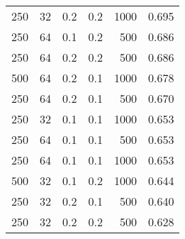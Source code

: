 \begin{table}[H]
\begin{tabular}{c|c|c|c|r|c}
    250                                & 32                             & 0.2                         & 0.2                                  & 1000                                & 0.695                  \\
    250                                & 64                             & 0.1                         & 0.2                                  & 500                                 & 0.686                  \\
    250                                & 64                             & 0.2                         & 0.2                                  & 500                                 & 0.686                  \\
    500                                & 64                             & 0.2                         & 0.1                                  & 1000                                & 0.678                  \\
    250                                & 64                             & 0.2                         & 0.1                                  & 500                                 & 0.670                  \\
    250                                & 32                             & 0.1                         & 0.1                                  & 1000                                & 0.653                  \\
    250                                & 64                             & 0.1                         & 0.1                                  & 500                                 & 0.653                  \\
    250                                & 64                             & 0.1                         & 0.1                                  & 1000                                & 0.653                  \\
    500                                & 32                             & 0.1                         & 0.2                                  & 1000                                & 0.644                  \\
    250                                & 32                             & 0.2                         & 0.1                                  & 500                                 & 0.640                  \\
    250                                & 32                             & 0.2                         & 0.2                                  & 500                                 & 0.628                  \\

\end{tabular}
\end{table}

